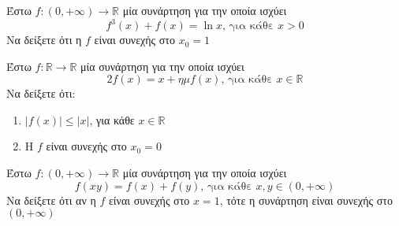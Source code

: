 \documentclass{presentation}
\begin{document}
\begin{askisi}
  Έστω $f:(0,+\infty)\to\mathbb{R}$ μία συνάρτηση για την οποία ισχύει
  $$f^3(x)+f(x)=\ln x \text{, για κάθε } x>0$$
  Να δείξετε ότι η $f$ είναι συνεχής στο $x_0=1$

\end{askisi}

\begin{askisi}
  Έστω $f:\mathbb{R}\to\mathbb{R}$ μία συνάρτηση για την οποία ισχύει
  $$2f(x)=x+ημf(x) \text{, για κάθε } x\in\mathbb{R}$$
  Να δείξετε ότι:
  \begin{enumerate}[<+->]
    \item $|f(x)|\le |x|$, για κάθε $x\in\mathbb{R}$
    \item Η $f$ είναι συνεχής στο $x_0=0$
  \end{enumerate}

\end{askisi}

\begin{askisi}
  Έστω $f:(0,+\infty)\to\mathbb{R}$ μία συνάρτηση για την οποία ισχύει
  $$f(xy)=f(x)+f(y) \text{, για κάθε } x,y\in(0,+\infty)$$
  Να δείξετε ότι αν η $f$ είναι συνεχής στο $x=1$, τότε η συνάρτηση είναι συνεχής στο $(0,+\infty)$

\end{askisi}
\end{document}

